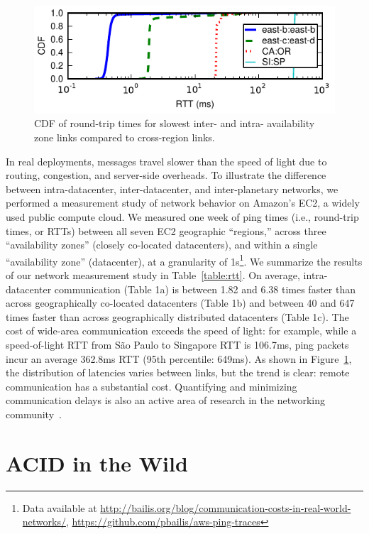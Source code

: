 \begin{figure}[t!]
\includegraphics[width=\columnwidth]{figs/ping-plot.pdf}\vspace{-1em}
\caption{CDF of round-trip times for slowest inter- and intra-
  availability zone links compared to cross-region links.}\vspace{-1em}
\label{fig:rtt}
\end{figure}

In real deployments, messages travel slower than the speed of light
due to routing, congestion, and server-side overheads. To illustrate
the difference between intra-datacenter, inter-datacenter, and
inter-planetary networks, we performed a measurement study of network
behavior on Amazon's EC2, a widely used public compute cloud. We
measured one week of ping times (i.e., round-trip times, or RTTs)
between all seven EC2 geographic ``regions,'' across three
``availability zones'' (closely co-located datacenters), and within a
single ``availability zone'' (datacenter), at a granularity of
1s\footnote{Data available at {\scriptsize
    \url{http://bailis.org/blog/communication-costs-in-real-world-networks/},
    \url{https://github.com/pbailis/aws-ping-traces}}}. We summarize
the results of our network measurement study in
Table~\ref{table:rtt}. On average, intra-datacenter communication
(Table 1a) is between 1.82 and 6.38 times faster than across
geographically co-located datacenters (Table 1b) and between 40 and
647 times faster than across geographically distributed datacenters
(Table 1c). The cost of wide-area communication exceeds the speed of
light: for example, while a speed-of-light RTT from S\~{a}o Paulo to
Singapore RTT is 106.7ms, ping packets incur an average 362.8ms RTT
(95th percentile: 649ms). As shown in Figure~\ref{fig:rtt}, the
distribution of latencies varies between links, but the trend is
clear: remote communication has a substantial cost. Quantifying and
minimizing communication delays is also an active area of research in
the networking community~\cite{bobtail}.

\section{ACID in the Wild}
\label{sec:modernacid}

